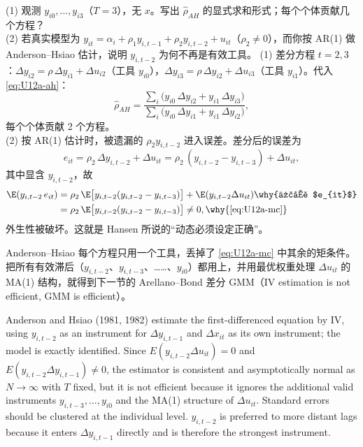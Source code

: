 \begin{prac}\label{pr:U12a-4}
(1) 观测 $y_{i0},\dots,y_{i3}$（$T=3$），无 $x$。写出 $\hat\rho_{AH}$ 的显式求和形式；每个个体贡献几个方程？\\
(2) 若真实模型为 $y_{it}=\alpha_i+\rho_1y_{i,t-1}+\rho_2y_{i,t-2}+u_{it}$（$\rho_2\neq0$），而你按 AR(1) 做 Anderson–Hsiao 估计，说明 $y_{i,t-2}$ 为何不再是有效工具。
\answer
(1) 差分方程 $t=2,3$：$\Delta y_{i2}=\rho\,\Delta y_{i1}+\Delta u_{i2}$（工具 $y_{i0}$），$\Delta y_{i3}=\rho\,\Delta y_{i2}+\Delta u_{i3}$（工具 $y_{i1}$）。代入 \eqref{eq:U12a-ah}：
\[
\hat\rho_{AH}=\frac{\sum_i\bigl(y_{i0}\,\Delta y_{i2}+y_{i1}\,\Delta y_{i3}\bigr)}{\sum_i\bigl(y_{i0}\,\Delta y_{i1}+y_{i1}\,\Delta y_{i2}\bigr)},
\]
每个个体贡献 2 个方程。\\
(2) 按 AR(1) 估计时，被遗漏的 $\rho_2y_{i,t-2}$ 进入误差。差分后的误差为
\[
e_{it}=\rho_2\,\Delta y_{i,t-2}+\Delta u_{it}=\rho_2\,(y_{i,t-2}-y_{i,t-3})+\Delta u_{it},
\]
其中显含 $y_{i,t-2}$，故
\begin{align*}
\E(y_{i,t-2}\,e_{it})&=\rho_2\,\E\bigl[y_{i,t-2}(y_{i,t-2}-y_{i,t-3})\bigr]+\E(y_{i,t-2}\Delta u_{it}) \why{代入 $e_{it}$}\\
&=\rho_2\,\E\bigl[y_{i,t-2}(y_{i,t-2}-y_{i,t-3})\bigr]\neq0, \why{\eqref{eq:U12a-mc}}
\end{align*}
外生性被破坏。这就是 Hansen 所说的“动态必须设定正确”。
\end{prac}

Anderson–Hsiao 每个方程只用一个工具，丢掉了 \eqref{eq:U12a-mc} 中其余的矩条件。把所有有效滞后（$y_{i,t-2}$、$y_{i,t-3}$、……、$y_{i0}$）都用上，并用最优权重处理 $\Delta u_{it}$ 的 MA(1) 结构，就得到下一节的 Arellano–Bond 差分 GMM（IV estimation is not efficient, GMM is efficient）。

\begin{english}
Anderson and Hsiao (1981, 1982) estimate the first-differenced equation by IV, using $y_{i,t-2}$ as an instrument for $\Delta y_{i,t-1}$ and $\Delta x_{it}$ as its own instrument; the model is exactly identified. Since $E(y_{i,t-2}\Delta u_{it})=0$ and $E(y_{i,t-2}\Delta y_{i,t-1})\neq0$, the estimator is consistent and asymptotically normal as $N\to\infty$ with $T$ fixed, but it is not efficient because it ignores the additional valid instruments $y_{i,t-3},\dots,y_{i0}$ and the MA(1) structure of $\Delta u_{it}$. Standard errors should be clustered at the individual level. $y_{i,t-2}$ is preferred to more distant lags because it enters $\Delta y_{i,t-1}$ directly and is therefore the strongest instrument.
\end{english}
